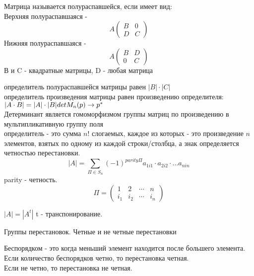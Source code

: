   Матрица называется полураспавшейся, если имеет вид:\\
  Верхняя полураспавшаяся -
  \begin{displaymath}
  A\left(\begin{array}{lr}
  B & 0\\
  D & C
  \end{array}\right)
  \end{displaymath}
  Нижняя полураспавшаяся -
  \begin{displaymath}
  A\left(\begin{array}{lr}
  B & D\\
  0 & C
  \end{array}\right)
  \end{displaymath}
  В и C - квадратные матрицы, D - любая матрица

 определитель полураспавшейся матрицы равен $|B|\cdot |C|$\\
 определитель произведения матрицы равен произведению определителя:
$|A \cdot B| = |A| \cdot |B|\\
det M_n(p) \to p^*$\\
Детерминант является гомоморфизмом группы матриц по произведению в
мультипликативную группу поля\\
 определитель - это сумма $n!$ слогаемых, каждое из которых - это
произведение $n$ элементов, взятых по одному из каждой строки/столбца,
а знак определяется четностью перестановки.\\

\[|A| = \sum_{\Pi \in S_n} (-1)^{parity\Pi} a_{1i1} \cdot a_{2i2}
\cdot ... a_{nin}\] parity - четность.
  \begin{displaymath}
  \Pi = \left(\begin{array}{lccr}
  1   & 2   & \cdots & n\\
  i_1 & i_2 & \cdots & i_n
  \end{array}\right)
  \end{displaymath}

 $|A|=|A^t|$ t - транспонирование.\\

\begin{title}
  Группы перестановок. Четные и не четные перестановки
\end{title}

\begin{defin}
  Беспорядком - это когда меньший элемент находится после большего элемента.\\
  Если количество беспорядков четно, то перестановка четная.\\
  Если не четно, то перестановка не четная.
\end{defin}

